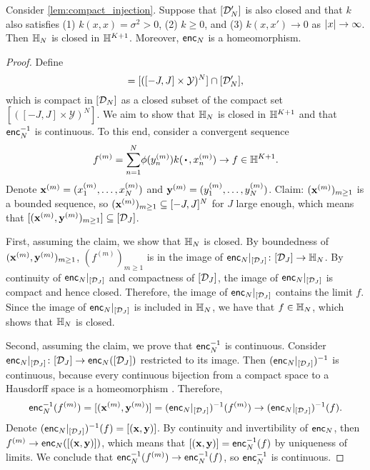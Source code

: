 \documentclass[12pt, twoside]{report}
\begin{document}
\begin{lemma} \label{lem:closed_injection}
    Consider \cref{lem:compact_injection}.
    Suppose that $[\mathcal{D}'_N]$ is also closed and that $k$ also satisfies
    (1) $k(x, x) = \sigma^2 > 0$,
    (2) $k \ge 0$, and
    (3) $k(x, x') \to 0$ as $\lvert x\rvert \to \infty$.
    Then $\mathbb{H}_N$ is closed in $\mathbb{H}^{K+1}$.
    Moreover, $\mathsf{enc}_N$ is a homeomorphism.
\end{lemma}
\begin{proof}
    Define 
    \begin{equation}
        [\D_J]
        =
        [([-J, J] \times \mathcal{Y})^N]
        \cap [\D'_N],
    \end{equation}
    which is compact in $[\mathcal{D}_N]$ as a closed subset of the compact set $[([-J, J] \times \mathcal{Y})^N]$.
    We aim to show that $\mathbb{H}_N$ is closed in $\mathbb{H}^{K+1}$ and that $\mathsf{enc}_N^{-1}$ is continuous.
    To this end, consider a convergent sequence 
    \begin{equation}
        f^{(m)} = {\sum_{n=1}^N} \phi(y^{(m)}_n) k(\vardot, x^{(m)}_n)
        \to f \in \Hb^{K+1}.
    \end{equation}
    Denote $\mathbf{x}^{(m)} = (x^{(m)}_1, \ldots, x^{(m)}_N)$ and $\mathbf{y}^{(m)} = (y^{(m)}_1, \ldots, y^{(m)}_N)$.
    Claim: $(\mathbf{x}^{(m)})_{m\ge1}$ is a bounded sequence, so $(\mathbf{x}^{(m)})_{m\ge1} \subseteq [-J, J]^{N}$ for $J$ large enough, which means that $[(\mathbf{x}^{(m)}, \mathbf{y}^{(m)})_{m\ge1}] \subseteq [\mathcal{D}_J]$.
    
    First, assuming the claim, we show that $\mathbb{H}_N$ is closed.
    By boundedness of $(\mathbf{x}^{(m)}, \mathbf{y}^{(m)})_{m\ge1}$, $(f^{(m)})_{m\ge1}$ is in the image of $\mathsf{enc}_N|_{[\mathcal{D}_J]} \colon [\mathcal{D}_J] \to \mathbb{H}_N$.
    By continuity of $\mathsf{enc}_N|_{[\mathcal{D}_J]}$ and compactness of $[\mathcal{D}_J]$, the image of $\mathsf{enc}_N|_{[\mathcal{D}_J]}$ is compact and hence closed.
    Therefore, the image of $\mathsf{enc}_N|_{[\mathcal{D}_J]}$ contains the limit $f$.
    Since the image of $\mathsf{enc}_N|_{[\mathcal{D}_J]}$ is included in $\mathbb{H}_N$, we have that $f \in \mathbb{H}_N$, which shows that $\mathbb{H}_N$ is closed.

    Second, assuming the claim, we prove that $\mathsf{enc}_N^{-1}$ is continuous.
    Consider $\mathsf{enc}_N|_{[\mathcal{D}_J]} \colon [\mathcal{D}_J] \to \mathsf{enc}_N([\mathcal{D}_J])$ restricted to its image.
    Then $(\mathsf{enc}_N|_{[\mathcal{D}_J]})^{-1}$ is continuous, because every continuous bijection from a compact space to a Hausdorff space is a homeomorphism \parencite[Theorem 26.6;][]{Munkres:2000:Topology}.
    Therefore,%
    \begin{equation}
        \mathsf{enc}_N^{-1}(f^{(m)})
        = [(\mathbf{x}^{(m)}, \mathbf{y}^{(m)})]
        = (\mathsf{enc}_N|_{[\mathcal{D}_J]})^{-1}(f^{(m)})
        \to (\mathsf{enc}_N|_{[\mathcal{D}_J]})^{-1}(f).
    \end{equation}
    Denote $(\mathsf{enc}_N|_{[\mathcal{D}_J]})^{-1}(f) = [(\mathbf{x}, \mathbf{y})]$.
    By continuity and invertibility of $\mathsf{enc}_N$, then $f^{(m)} \to \mathsf{enc}_N([(\mathbf{x}, \mathbf{y})])$, which means that $[(\mathbf{x}, \mathbf{y})] = \mathsf{enc}_N^{-1}(f)$  by uniqueness of limits.
    We conclude that $\mathsf{enc}_N^{-1}(f^{(m)}) \to \mathsf{enc}_N^{-1}(f)$, so $\mathsf{enc}_N^{-1}$ is continuous.
    

\end{proof}
\end{document}

